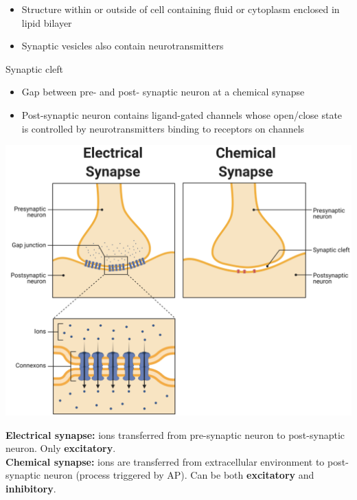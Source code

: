 \documentclass[11pt,fleqn]{book} %
\begin{document}
\begin{descriptions}
\begin{itemize}
        \item Structure within or outside of cell containing fluid or cytoplasm enclosed in lipid bilayer
        \item Synaptic vesicles also contain neurotransmitters
    \end{itemize}
    \item[Synaptic cleft]
    \begin{descriptions}
    \end{descriptions}
    \begin{itemize}
        \item Gap between pre- and post- synaptic neuron at a chemical synapse 
        \item Post-synaptic neuron contains ligand-gated channels whose open/close state is controlled by neurotransmitters binding to receptors on channels
    \end{itemize}
\end{descriptions}
\begin{center}
    \includegraphics[width=0.65\linewidth]{Pictures/Screenshot 2024-02-26 005340.png}
\end{center}
\begin{remark}
    \textbf{Electrical synapse:} ions transferred from pre-synaptic neuron to post-synaptic neuron. Only \textbf{excitatory}.\\
    \textbf{Chemical synapse:} ions are transferred from extracellular environment to post-synaptic neuron (process triggered by AP). Can be both \textbf{excitatory} and \textbf{inhibitory}.
\end{remark}
\end{document}
